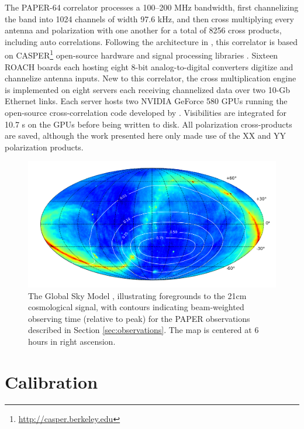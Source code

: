 \documentclass[twocolumn,numberedappendix]{emulateapj} \shorttitle{PSA64}
\begin{document}
The PAPER-64 correlator processes a 100--200 MHz bandwidth, first
channelizing the band into 1024 channels of width 97.6 kHz, and then
cross multiplying every antenna and polarization with one another for a total of
8256 cross products, including auto correlations.  Following the architecture 
in \citet{parsons_et_al2008}, this
correlator is based on CASPER\footnote{\url{http://casper.berkeley.edu}} open-source
hardware and signal processing libraries \citep{parsons_et_al2006}.  
Sixteen ROACH boards each hosting eight 8-bit analog-to-digital
converters digitize and channelize antenna inputs. New to this correlator,
the cross multiplication engine is implemented on eight servers each receiving
channelized data over two 10-Gb Ethernet links.  Each server hosts
two NVIDIA GeForce 580 GPUs running the open-source cross-correlation code developed
by \citet{clark_et_al2013}.
Visibilities are integrated for 10.7 s on the GPUs before
being written to disk.  All polarization cross-products are saved, although the
work presented here only made use of the XX and YY polarization products.

\begin{figure}\centering
\includegraphics[width=2\columnwidth]{plots/coverage.png}
\caption{The Global Sky Model \citep{deoliveira2008}, illustrating foregrounds to the 21cm
cosmological signal, with 
contours indicating beam-weighted observing time (relative to peak) for the PAPER observations
described in Section \ref{sec:observations}.  The map is centered at 6 hours in right ascension.
}\label{fig:coverage}
\end{figure}


\section{Calibration}\label{sec:calib}
\end{document}
